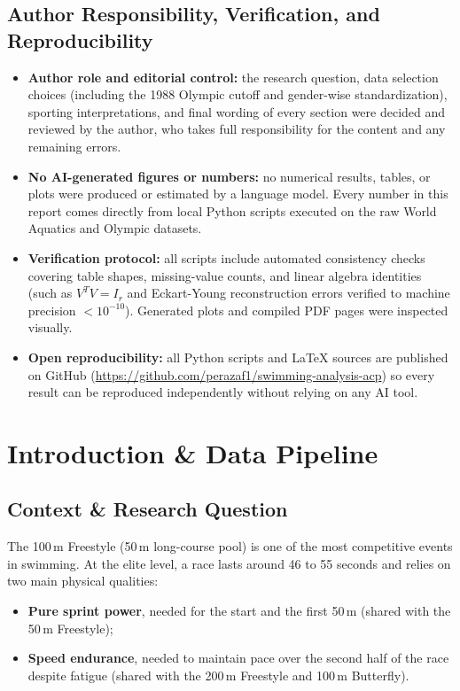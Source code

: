 \documentclass[11pt, a4paper]{article}
\begin{document}
\subsection*{Author Responsibility, Verification, and Reproducibility}
\begin{itemize}
    \item \textbf{Author role and editorial control:} the research question, data selection choices (including the 1988 Olympic cutoff and gender-wise standardization), sporting interpretations, and final wording of every section were decided and reviewed by the author, who takes full responsibility for the content and any remaining errors.

    \item \textbf{No AI-generated figures or numbers:} no numerical results, tables, or plots were produced or estimated by a language model. Every number in this report comes directly from local Python scripts executed on the raw World Aquatics and Olympic datasets.

    \item \textbf{Verification protocol:} all scripts include automated consistency checks covering table shapes, missing-value counts, and linear algebra identities (such as $V^T V = I_r$ and Eckart-Young reconstruction errors verified to machine precision $< 10^{-10}$). Generated plots and compiled PDF pages were inspected visually.

    \item \textbf{Open reproducibility:} all Python scripts and \LaTeX{} sources are published on GitHub (\url{https://github.com/perazaf1/swimming-analysis-acp}) so every result can be reproduced independently without relying on any AI tool.
\end{itemize}

\section{Introduction \texorpdfstring{\&}{and} Data Pipeline}
\label{sec:intro}

\subsection{Context \texorpdfstring{\&}{and} Research Question}

The 100\,m Freestyle (50\,m long-course pool) is one of the most competitive events in swimming. At the elite level, a race lasts around 46 to 55 seconds and relies on two main physical qualities:
\begin{itemize}
    \item \textbf{Pure sprint power}, needed for the start and the first 50\,m (shared with the 50\,m Freestyle);
    \item \textbf{Speed endurance}, needed to maintain pace over the second half of the race despite fatigue (shared with the 200\,m Freestyle and 100\,m Butterfly).
\end{itemize}
\end{document}
